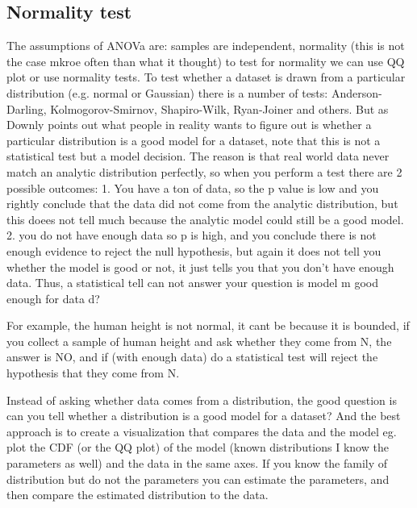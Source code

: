 \documentclass[11pt]{article}
\theoremstyle{definition}
\theoremstyle{remark}
\begin{document}
\subsection{Normality test}
\label{sse:normal}
The assumptions of ANOVa are: samples are independent, normality (this is not the case mkroe often than what it thought) to test for normality we can use QQ plot or use normality tests. To test whether a dataset is drawn from a particular distribution (e.g. normal or Gaussian) there is a number of tests: Anderson-Darling, Kolmogorov-Smirnov, Shapiro-Wilk, Ryan-Joiner and others. 
But as Downly points out what people in reality wants to figure out is whether a particular distribution is a good model for a dataset, note that this  is not a statistical test but a model decision. The reason is that real world data never match an analytic distribution perfectly, so when you perform a test there are 2 possible outcomes:
1. You have a ton of data, so the p value is low and you rightly conclude that the data did not come from the analytic distribution, but this doees not tell much because the analytic model could still be a good model. 2. you do not have enough data so p is high, and you conclude there is not enough evidence to reject the null hypothesis, but again it does not tell you whether the model is good or not, it just tells you that you don't have enough data. Thus, a statistical tell can not answer your question is model m good enough for data d?

For example, the human height is not normal, it cant be because it is bounded, if you collect a sample of human height and ask whether they come from N, the answer is NO, and if (with enough data) do a statistical test will reject the hypothesis that they come from N.

Instead of asking whether data comes from a distribution, the good question is can you tell whether a distribution is a good model for a dataset?
 And the best approach is to create a visualization that compares the data and the model eg. plot the CDF (or the QQ plot) of the model (known distributions I know the parameters as well) and the data in the same axes. If you know the family of distribution but do not the parameters you can estimate the parameters, and then compare the estimated distribution to the data.
\end{document}

